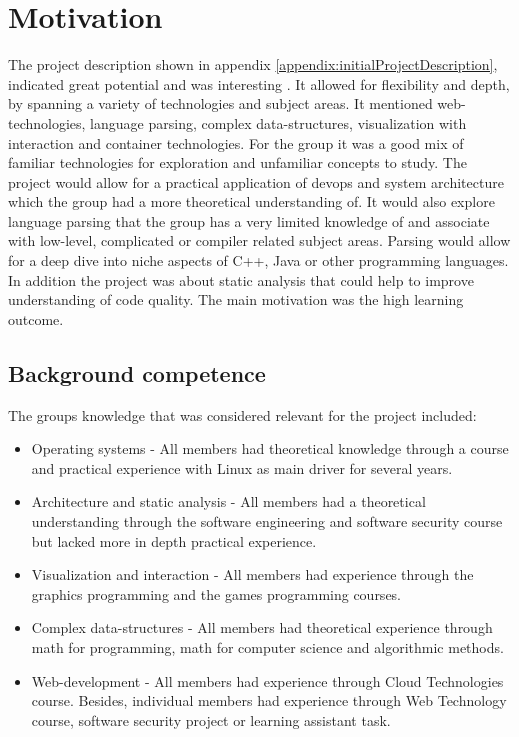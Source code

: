 \section{Motivation}
%
%
The project description shown in appendix \ref{appendix:initialProjectDescription}, indicated great potential and was interesting . It allowed for flexibility and depth, by spanning a variety of technologies and subject areas. It mentioned web-technologies, language parsing, complex data-structures, visualization with interaction and container technologies. For the group it was a good mix of familiar technologies for exploration and unfamiliar concepts to study. The project would allow for a practical application of \gls{devops} and system architecture which the group had a more theoretical understanding of. It would also explore language parsing that the group has a very limited knowledge of and associate with low-level, complicated or compiler related subject areas. Parsing would allow for a deep dive into niche aspects of C++, Java or other programming languages. In addition the project was about static analysis that could help to improve understanding of code quality. The main motivation was the high learning outcome.

\subsection{Background competence}
\label{sec:competence}

The groups knowledge that was considered relevant for the project included:
\begin{itemize}
    \item Operating systems - All members had theoretical knowledge through a course and practical experience with Linux as main driver for several years.
    \item Architecture and static analysis - All members had a theoretical understanding through the software engineering and software security course but lacked more in depth practical experience.
    \item Visualization and interaction - All members had experience through the graphics programming and the games programming courses. 
    \item Complex data-structures - All members had theoretical experience through math for programming, math for computer science and algorithmic methods.
    \item Web-development - All members had experience through Cloud Technologies course. Besides, individual members had experience through Web Technology course, software security project or learning assistant task. 
\end{itemize}
